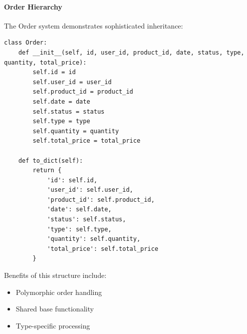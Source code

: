 \documentclass[12pt,a4paper]{article}
\begin{document}
\paragraph{Order Hierarchy}
The Order system demonstrates sophisticated inheritance:
\begin{verbatim}
class Order:
    def __init__(self, id, user_id, product_id, date, status, type, quantity, total_price):
        self.id = id
        self.user_id = user_id
        self.product_id = product_id
        self.date = date
        self.status = status
        self.type = type
        self.quantity = quantity
        self.total_price = total_price

    def to_dict(self):
        return {
            'id': self.id,
            'user_id': self.user_id,
            'product_id': self.product_id,
            'date': self.date,
            'status': self.status,
            'type': self.type,
            'quantity': self.quantity,
            'total_price': self.total_price
        }
\end{verbatim}

Benefits of this structure include:
\begin{itemize}
    \item Polymorphic order handling
    \item Shared base functionality
    \item Type-specific processing
\end{itemize}
\end{document}

